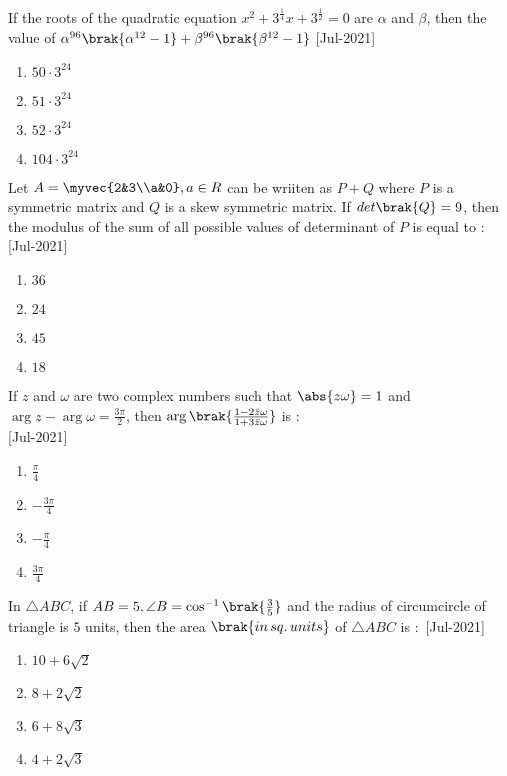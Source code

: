     \item If the roots of the quadratic equation $x^2+3^{\frac{1}{4}}x+3^{\frac{1}{2}}=0$ are $\alpha$ and $\beta$, then the value of $\alpha^{96}\brak{\alpha^{12}-1}+\beta^{96}\brak{\beta^{12}-1}$
    \hfill{[Jul-2021]}
        \begin{enumerate}
            \item $50\cdot 3^{24}$
            \item $51\cdot 3^{24}$
            \item $52\cdot 3^{24}$
            \item $104\cdot 3^{24}$
        \end{enumerate}
    \item Let $A=\myvec{2&3\\a&0},a\in R$ can be wriiten as $P+Q$ where $P$ is a symmetric matrix and $Q$ is a skew symmetric matrix. If $det\brak{Q}=9$, then the modulus of the sum of all possible values of determinant of $P$ is equal to $\colon$
    \hfill{[Jul-2021]}
        \begin{enumerate}
            \item $36$
            \item $24$
            \item $45$
            \item $18$
        \end{enumerate}
    \item If $z$ and $\omega$ are two complex numbers such that $\abs{z\omega}=1$ and $\arg{z}-\arg{\omega}=\frac{3\pi}{2}$, then $\arg{\brak{\frac{1-2\Bar{z}\omega}{1+3\Bar{z}\omega}}}$ is $\colon$\\
    \hfill{[Jul-2021]}
        \begin{enumerate}
            \item $\frac{\pi}{4}$
            \item $-\frac{3\pi}{4}$
            \item $-\frac{\pi}{4}$
            \item $\frac{3\pi}{4}$
        \end{enumerate}
    \item In $\triangle ABC$, if $AB=5,\angle B=\cos^{-1}\brak{\frac{3}{5}}$ and the radius of circumcircle of triangle is $5$ units, then the area $\brak{in \, sq. \, units}$ of $\triangle ABC$ is $\colon$
    \hfill{[Jul-2021]}
        \begin{enumerate}
            \item $10+6\sqrt{2}$
            \item $8+2\sqrt{2}$
            \item $6+8\sqrt{3}$
            \item $4+2\sqrt{3}$
        \end{enumerate}
